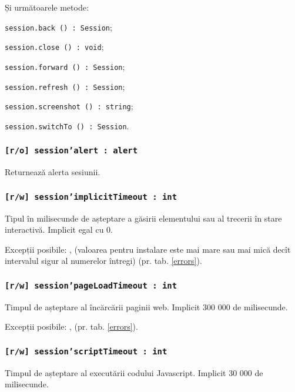 Și următoarele metode:
\begin{icItems}
	\item \texttt{session.back () : Session};
	\item \texttt{session.close () : void};
	\item \texttt{session.forward () : Session};
	\item \texttt{session.refresh () : Session};
	\item \texttt{session.screenshot () : string};
	\item \texttt{session.switchTo () : Session}.
\end{icItems}

\subsubsection{\texttt{[r/o] session'alert : alert}}

Returnează alerta sesiunii.

\subsubsection{\texttt{[r/w] session'implicitTimeout : int}}

Tipul în milisecunde de așteptare a găsirii elementului sau al trecerii în stare interactivă. Implicit egal cu 0.

Excepții posibile: ,  (valoarea pentru instalare este mai mare sau mai mică decît intervalul sigur al numerelor întregi) (pr. tab. \ref{errors}).

\subsubsection{\texttt{[r/w] session'pageLoadTimeout : int}}

Timpul de așteptare al încărcării paginii web. Implicit 300 000 de milisecunde.

Excepții posibile: ,  (pr. tab. \ref{errors}).

\subsubsection{\texttt{[r/w] session'scriptTimeout : int}}

Timpul de așteptare al executării codului Javascript. Implicit 30 000 de milisecunde.

